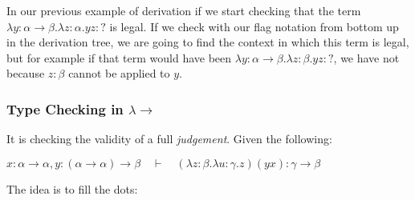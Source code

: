 \documentclass[12pt, a4paper]{article}
\newcommand{\deriv}{\quad\vdash\quad}
\begin{document}
In our previous example of derivation if we start checking that the term $\lambda y : \alpha \to \beta . \lambda z : \alpha . yz : ?$ is legal.
If we check with our flag notation from bottom up in the derivation tree, we are going to find the context in which this term is legal, but for example
if that term would have been $\lambda y : \alpha \to \beta . \lambda z : \beta . yz : ?$, we have not because $z : \beta$ cannot be applied to $y$.

\subsubsection{Type Checking in \texorpdfstring{$\lambda\to$}{Lg}}
It is checking the validity of a full \textit{judgement}.
Given the following: 

$x : \alpha \to \alpha, y : (\alpha \to \alpha) \to \beta \deriv (\lambda z : \beta . \lambda u : \gamma . z)(yx) : \gamma \to \beta$

\begin{flagderiv}
    \skipsteps*{\vdots}{}
  \end{flagderiv}

The idea is to fill the dots:

\begin{flagderiv}
    \skipsteps*{\vdots}{}
  \end{flagderiv}

  \begin{flagderiv}
  \end{flagderiv}
\end{document}

